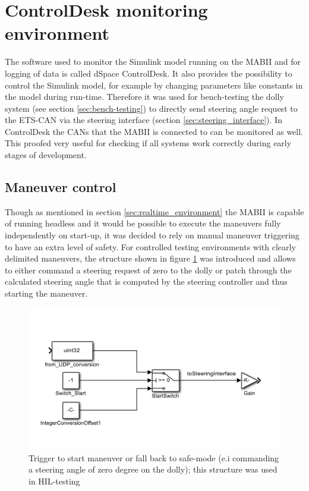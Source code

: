 \documentclass[ExampleMasters.tex]{subfiles}
\begin{document}
\section{ControlDesk monitoring environment}
\label{sec:control_desk}
The software used to monitor the Simulink model running on the \gls{MABII} and for logging of data is called dSpace ControlDesk. It also provides the possibility to control the Simulink model, for example by changing parameters like constants in the model during run-time. Therefore it was used for bench-testing the dolly system (see section \ref{sec:bench-testing}) to directly send steering angle request to the \gls{ETS}-\gls{CAN} via the steering interface (section \ref{sec:steering_interface}). In ControlDesk the \gls{CAN}s that the \gls{MABII} is connected to can be monitored as well. This proofed very useful for checking if all systems work correctly during early stages of development. 

\subsection{Maneuver control}
Though as mentioned in section \ref{sec:realtime_environment} the \gls{MABII} is capable of running headless and it would be possible to execute the maneuvers fully independently on start-up, it was decided to rely on manual maneuver triggering to have an extra level of safety. For controlled testing environments with clearly delimited maneuvers, the structure shown in figure \ref{fig:controlDesk_trigger} was introduced and allows to either command a steering request of zero to the dolly or patch through the calculated steering angle that is computed by the steering controller and thus starting the maneuver. 

\begin{figure}[!htb]
	\centering
	\includegraphics[width=0.6\linewidth]{figures/controlDesk_trigger}
	\caption{Trigger to start maneuver or fall back to safe-mode (e.i commanding a steering angle of zero degree on the dolly); this structure was used in \gls{HIL}-testing}
	\label{fig:controlDesk_trigger}
\end{figure}
\end{document}

